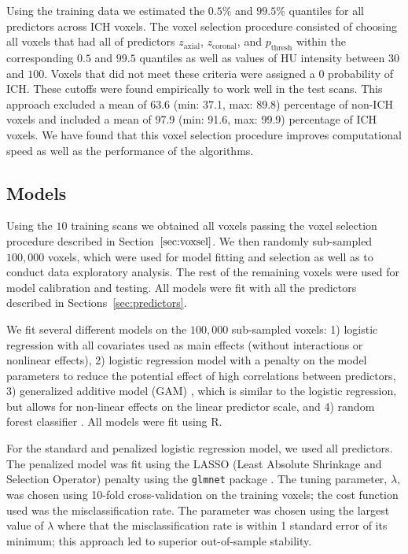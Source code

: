 \documentclass{elsarticle_nonatbib}\usepackage[]{graphicx}\usepackage[]{color}
\newcommand{\pkg}[1]{\texttt{#1}}
\begin{document}
Using the training data we estimated the $0.5\%$ and $99.5\%$ quantiles for all predictors across ICH voxels. The voxel selection procedure consisted of choosing all voxels that had all of predictors $z_{\text{axial}}$, $z_{\text{coronal}}$, and $p_{\text{thresh}}$ within the corresponding $0.5$ and $99.5$ quantiles as well as values of HU intensity between $30$ and $100$. Voxels that did not meet these criteria were assigned a $0$ probability of ICH. These cutoffs were found empirically to work well in the test scans. This approach excluded a mean of  63.6 (min: 37.1, max: 89.8) percentage of non-ICH voxels and included a mean of 97.9 (min: 91.6, max: 99.9) percentage of ICH voxels.  We have found that this voxel selection procedure improves computational speed as well as the performance of the algorithms.  

\subsection{Models}
\label{sec:mods}
Using the $10$ training scans we obtained all voxels passing the voxel selection procedure described in Section~$\ref{sec:voxsel}$.  We then randomly sub-sampled $100{,}000$ voxels, which were used for model fitting and selection as well as to conduct data exploratory analysis.  The rest of the remaining voxels were used for model calibration and testing.   All models were fit with all the predictors described in Sections~\ref{sec:predictors}.  


We fit several different models on the $100{,}000$ sub-sampled voxels: 1) logistic regression with all covariates used as main effects (without interactions or nonlinear effects), 2) logistic regression model with a penalty on the model parameters to reduce the potential effect of high correlations between predictors, 3) generalized additive model (GAM) \citep{hastie_generalized_1986, hastie_generalized_1990}, which is similar to the logistic regression, but allows for non-linear effects on the linear predictor scale, and 4) random forest classifier \citep{breiman2001random}.  All models were fit using R.

For the standard and penalized logistic regression model, we used all predictors.  The penalized model was fit using the LASSO (Least Absolute Shrinkage and Selection Operator) penalty \citep{tibshirani_regression_1996} using the \pkg{glmnet} package \citep{friedman_regularization_2010}.  The tuning parameter, $\lambda$, was chosen using 10-fold cross-validation on the training voxels; the cost function used was the misclassification rate.  The parameter was chosen using the largest value of $\lambda$ where that the misclassification rate is within 1 standard error of its minimum; this approach led to superior out-of-sample stability.
\end{document}
